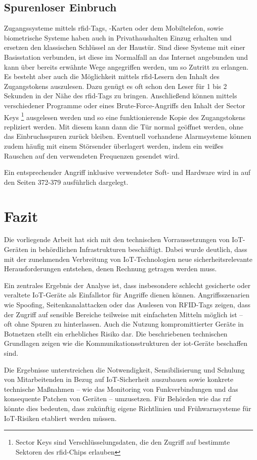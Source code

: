 \documentclass[12pt, a4paper, onecolumn, oneside, toc=bibliographynumbered, liststotoc]{scrreprt} %
\begin{document}
		\section{Spurenloser Einbruch}
        Zugangssysteme mittels \ac{rfid}-Tags, -Karten oder dem Mobiltelefon,  sowie biometrische Systeme haben auch in Privathaushalten Einzug erhalten und ersetzen den klassischen Schlüssel an der Haustür. Sind diese Systeme mit einer Basisstation verbunden, ist diese im Normalfall an das Internet angebunden und kann über bereits erwähnte Wege angegriffen werden, um so Zutritt zu erlangen. Es besteht aber auch die Möglichkeit mittels \ac{rfid}-Lesern den Inhalt des Zugangstokens auszulesen. Dazu genügt es oft schon den Leser für 1 bis 2 Sekunden in der Nähe des \ac{rfid}-Tags zu bringen. Anschließend können mittels verschiedener Programme oder eines Brute-Force-Angriffs den Inhalt der Sector Keys \footnote{Sector Keys sind Verschlüsselungsdaten, die den Zugriff auf bestimmte Sektoren des \ac{rfid}-Chips erlauben} ausgelesen werden und so eine funktionierende Kopie des Zugangstokens repliziert werden. Mit diesem kann dann die Tür normal geöffnet werden, ohne das Einbruchsspuren zurück bleiben. Eventuell vorhandene Alarmsysteme können zudem häufig mit einem Störsender überlagert werden, indem ein weißes Rauschen auf den verwendeten Frequenzen gesendet wird.

Ein entsprechender Angriff inklusive verwendeter Soft- und Hardware wird in  auf den Seiten 372-379 ausführlich dargelegt.

	\chapter{Fazit}
Die vorliegende Arbeit hat sich mit den technischen Vorraussetzungen von IoT-Geräten in behördlichen Infrastrukturen beschäftigt. Dabei wurde deutlich, dass mit der zunehmenden Verbreitung von IoT-Technologien neue sicherheitsrelevante Herausforderungen entstehen, denen Rechnung getragen werden muss.

Ein zentrales Ergebnis der Analyse ist, dass insbesondere schlecht gesicherte oder veraltete IoT-Geräte als Einfallstor für Angriffe dienen können. Angriffsszenarien wie Spoofing, Seitenkanalattacken oder das Auslesen von RFID-Tags zeigen, dass der Zugriff auf sensible Bereiche teilweise mit einfachsten Mitteln möglich ist – oft ohne Spuren zu hinterlassen. Auch die Nutzung kompromittierter Geräte in Botnetzen stellt ein erhebliches Risiko dar. Die beschriebenen technischen Grundlagen zeigen wie die Kommunikationsstrukturen der \ac{iot}-Geräte beschaffen sind.

Die Ergebnisse unterstreichen die Notwendigkeit, Sensibilisierung und Schulung von Mitarbeitenden in Bezug auf IoT-Sicherheit auszubauen sowie konkrete technische Maßnahmen – wie das Monitoring von Funkverbindungen und das konsequente Patchen von Geräten – umzusetzen. Für Behörden wie das \ac{rzf} könnte dies bedeuten, dass zukünftig eigene Richtlinien und Frühwarnsysteme für IoT-Risiken etabliert werden müssen.

\newpage %
\printbibliography[heading=bibintoc, title={Literaturverzeichnis}] %
\end{document}
